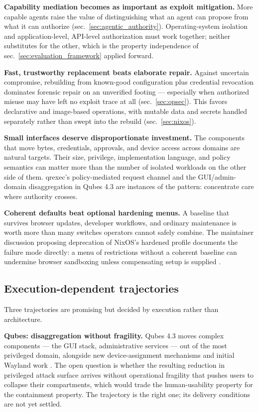 \documentclass[
  english,
  9pt,
]{extarticle}
\begin{document}
\textbf{Capability mediation becomes as important as exploit
mitigation.} More capable agents raise the value of distinguishing what
an agent can propose from what it can authorize
(sec.~\ref{sec:agentic_authority}). Operating-system isolation and
application-level, API-level authorization must work together; neither
substitutes for the other, which is the property independence of
sec.~\ref{sec:evaluation_framework} applied forward.

\textbf{Fast, trustworthy replacement beats elaborate repair.} Against
uncertain compromise, rebuilding from known-good configuration plus
credential revocation dominates forensic repair on an unverified footing
--- especially when authorized misuse may have left no exploit trace at
all (sec.~\ref{sec:opsec}). This favors declarative and image-based
operations, with mutable data and secrets handled separately rather than
swept into the rebuild (sec.~\ref{sec:nixos}).

\textbf{Small interfaces deserve disproportionate investment.} The
components that move bytes, credentials, approvals, and device access
across domains are natural targets. Their size, privilege,
implementation language, and policy semantics can matter more than the
number of isolated workloads on the other side of them. qrexec's
policy-mediated request channel \citep{qubes_qrexec} and the
GUI/admin-domain disaggregation in Qubes 4.3
\citep{qubes_43_release_notes} are instances of the pattern: concentrate
care where authority crosses.

\textbf{Coherent defaults beat optional hardening menus.} A baseline
that survives browser updates, developer workflows, and ordinary
maintenance is worth more than many switches operators cannot safely
combine. The maintainer discussion proposing deprecation of NixOS's
hardened profile documents the failure mode directly: a menu of
restrictions without a coherent baseline can undermine browser
sandboxing unless compensating setup is supplied
\citep{nixos_hardened_profile_deprecation}.

\subsection{Execution-dependent
trajectories}\label{execution-dependent-trajectories}

Three trajectories are promising but decided by execution rather than
architecture.

\textbf{Qubes: disaggregation without fragility.} Qubes 4.3 moves
complex components --- the GUI stack, administrative services --- out of
the most privileged domain, alongside new device-assignment mechanisms
and initial Wayland work \citep{qubes_43_release_notes}. The open
question is whether the resulting reduction in privileged attack surface
arrives without operational fragility that pushes users to collapse
their compartments, which would trade the human-usability property for
the containment property. The trajectory is the right one; its delivery
conditions are not yet settled.
\end{document}
